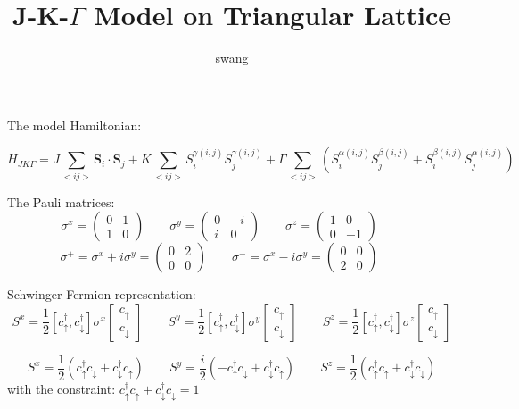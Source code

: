 \documentclass[12pt,a4paper]{article}
\author{swang}
\title{J-K-$\Gamma$ Model on Triangular Lattice}
\newcommand{\create}[1] {
    c_{#1}^\dagger
}
\newcommand{\hopping}[2] {
    c_{#1}^\dagger c_{#2}
}
\newcommand{\spinup} {
    \uparrow
}
\newcommand{\spindown} {
	\downarrow
}
\newcommand{\aij}{
	\alpha\left(i, j\right)
}
\newcommand{\bij}{
	\beta\left(i, j\right)
}
\newcommand{\gij}{
	\gamma\left(i, j\right)
}
\newcommand{\sumij} {
	\sum_{<ij>}
}
\newcommand{\sigmax} {
    \left(\begin{array}{cc} 0 & 1 \\ 1 & 0 \end{array} \right)
}
\newcommand{\sigmay} {
    \left(\begin{array}{cc} 0 & -i \\ i & 0 \end{array} \right)
}
\newcommand{\sigmaz} {
    \left(\begin{array}{cc} 1 & 0 \\ 0 & -1 \end{array} \right)
}
\newcommand{\sigmap} {
    \left(\begin{array}{cc} 0 & 2 \\ 0 & 0 \end{array} \right)
}
\newcommand{\sigmam} {
	\left(\begin{array}{cc} 0 & 0 \\ 2 & 0 \end{array} \right)
}
\begin{document}
\maketitle

\noindent
The model Hamiltonian:


\begin{equation*}
H_{JK\Gamma} = J \sumij \textbf{S}_i \cdot \textbf{S}_j
+ K \sumij S_i^{\gij} S_j^{\gij}
+ \Gamma \sumij \left(S_i^{\aij} S_j^{\bij} + S_i^{\bij} S_j^{\aij} \right)
\end{equation*}

\noindent
The Pauli matrices:
\begin{equation*}
    \sigma^x = \sigmax \qquad
    \sigma^y = \sigmay \qquad
    \sigma^z = \sigmaz \qquad
\end{equation*}
\begin{equation*}
    \sigma^+ = \sigma^x + i \sigma^y = \sigmap \qquad
    \sigma^- = \sigma^x - i \sigma^y = \sigmam \qquad
\end{equation*}

\noindent
Schwinger Fermion representation:
\begin{equation*}
    S^x = \frac{1}{2} \left[\create{\spinup}, \create{\spindown} \right] \sigma^x \left[\begin{array}{c} c_\spinup \\ c_\spindown \end{array}\right] \qquad
    S^y = \frac{1}{2} \left[\create{\spinup}, \create{\spindown} \right] \sigma^y \left[\begin{array}{c} c_\spinup \\ c_\spindown \end{array}\right] \qquad
    S^z = \frac{1}{2} \left[\create{\spinup}, \create{\spindown} \right] \sigma^z \left[\begin{array}{c} c_\spinup \\ c_\spindown \end{array}\right]
\end{equation*}

\begin{equation*}
    S^x = \frac{1}{2} \left(\hopping{\spinup}{\spindown} + \hopping{\spindown}{\spinup} \right) \qquad
    S^y = \frac{i}{2} \left(-\hopping{\spinup}{\spindown} + \hopping{\spindown}{\spinup} \right) \qquad
    S^z = \frac{1}{2} \left(\hopping{\spinup}{\spinup} + \hopping{\spindown}{\spindown} \right)
\end{equation*}
with the constraint: $\hopping{\spinup}{\spinup} + \hopping{\spindown}{\spindown} = 1$
\end{document}
